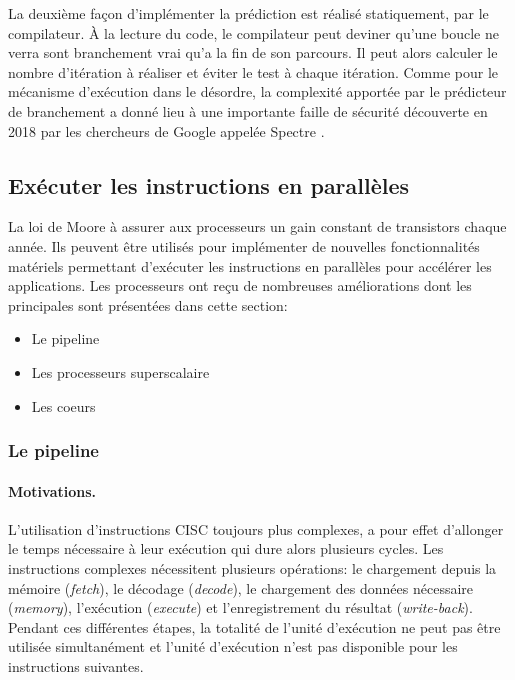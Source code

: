 La deuxième façon d'implémenter la prédiction est réalisé statiquement, par le compilateur. À la lecture du code, le compilateur peut deviner qu'une boucle ne verra sont branchement vrai qu'a la fin de son parcours. Il peut alors calculer le nombre d’itération à réaliser et éviter le test à chaque itération.
Comme pour le mécanisme d'exécution dans le désordre, la complexité apportée par le prédicteur de branchement a donné lieu à une importante faille de sécurité découverte en 2018 par les chercheurs de Google appelée Spectre \cite{kocher2018spectre}.






\subsection{Exécuter les instructions en parallèles} \label{sec:para}

La loi de Moore à assurer aux processeurs un gain constant de transistors chaque année. Ils peuvent être utilisés pour implémenter de nouvelles fonctionnalités matériels permettant d'exécuter les instructions en parallèles pour accélérer les applications. Les processeurs ont reçu de nombreuses améliorations dont les principales sont présentées dans cette section: 
\begin{itemize}
    \item Le pipeline
    \item Les processeurs superscalaire
    \item Les coeurs
\end{itemize}


\subsubsection{Le pipeline} \label{sec:pipeline}


\paragraph{Motivations.} 

L'utilisation d'instructions CISC toujours plus complexes, a pour effet d'allonger le temps nécessaire à leur exécution qui dure alors plusieurs cycles. Les instructions complexes nécessitent plusieurs opérations: le chargement depuis la mémoire (\textit{fetch}), le décodage (\textit{decode}), le chargement des données nécessaire (\textit{memory}), l'exécution (\textit{execute}) et l'enregistrement du résultat (\textit{write-back}). Pendant ces différentes étapes, la totalité de l'unité d'exécution ne peut pas être utilisée simultanément et l'unité d'exécution n'est pas disponible pour les instructions suivantes. 


